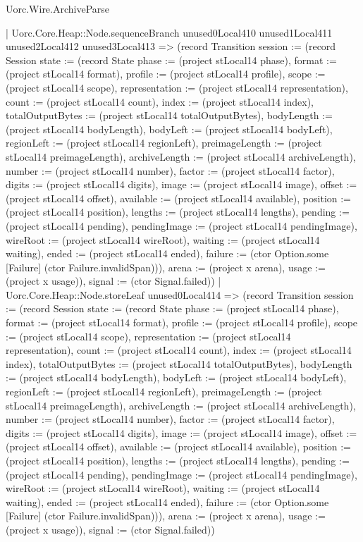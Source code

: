 \begin{lexlean}{Uorc.Wire.ArchiveParse}
\begin{semanticmodule}
{            | Uorc.Core.Heap::Node.sequenceBranch unused0Local410 unused1Local411 unused2Local412 unused3Local413 => (record Transition {session := (record Session {state := (record State {phase := (project stLocal14 phase), format := (project stLocal14 format), profile := (project stLocal14 profile), scope := (project stLocal14 scope), representation := (project stLocal14 representation), count := (project stLocal14 count), index := (project stLocal14 index), totalOutputBytes := (project stLocal14 totalOutputBytes), bodyLength := (project stLocal14 bodyLength), bodyLeft := (project stLocal14 bodyLeft), regionLeft := (project stLocal14 regionLeft), preimageLength := (project stLocal14 preimageLength), archiveLength := (project stLocal14 archiveLength), number := (project stLocal14 number), factor := (project stLocal14 factor), digits := (project stLocal14 digits), image := (project stLocal14 image), offset := (project stLocal14 offset), available := (project stLocal14 available), position := (project stLocal14 position), lengths := (project stLocal14 lengths), pending := (project stLocal14 pending), pendingImage := (project stLocal14 pendingImage), wireRoot := (project stLocal14 wireRoot), waiting := (project stLocal14 waiting), ended := (project stLocal14 ended), failure := (ctor Option.some [Failure] (ctor Failure.invalidSpan))}), arena := (project x arena), usage := (project x usage)}), signal := (ctor Signal.failed)})
            | Uorc.Core.Heap::Node.storeLeaf unused0Local414 => (record Transition {session := (record Session {state := (record State {phase := (project stLocal14 phase), format := (project stLocal14 format), profile := (project stLocal14 profile), scope := (project stLocal14 scope), representation := (project stLocal14 representation), count := (project stLocal14 count), index := (project stLocal14 index), totalOutputBytes := (project stLocal14 totalOutputBytes), bodyLength := (project stLocal14 bodyLength), bodyLeft := (project stLocal14 bodyLeft), regionLeft := (project stLocal14 regionLeft), preimageLength := (project stLocal14 preimageLength), archiveLength := (project stLocal14 archiveLength), number := (project stLocal14 number), factor := (project stLocal14 factor), digits := (project stLocal14 digits), image := (project stLocal14 image), offset := (project stLocal14 offset), available := (project stLocal14 available), position := (project stLocal14 position), lengths := (project stLocal14 lengths), pending := (project stLocal14 pending), pendingImage := (project stLocal14 pendingImage), wireRoot := (project stLocal14 wireRoot), waiting := (project stLocal14 waiting), ended := (project stLocal14 ended), failure := (ctor Option.some [Failure] (ctor Failure.invalidSpan))}), arena := (project x arena), usage := (project x usage)}), signal := (ctor Signal.failed)})
}
\end{semanticmodule}
\end{lexlean}
